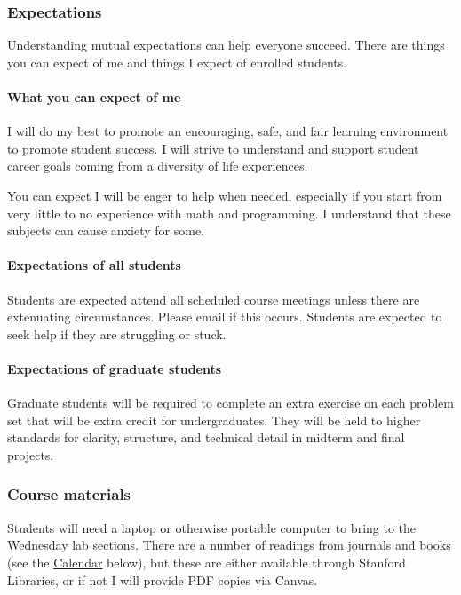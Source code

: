 \documentclass[
]{article}
\begin{document}
\subsubsection{Expectations}\label{expectations}

Understanding mutual expectations can help everyone succeed. There are
things you can expect of me and things I expect of enrolled students.

\paragraph{What you can expect of me}\label{what-you-can-expect-of-me}

I will do my best to promote an encouraging, safe, and fair learning
environment to promote student success. I will strive to understand and
support student career goals coming from a diversity of life
experiences.

You can expect I will be eager to help when needed, especially if you
start from very little to no experience with math and programming. I
understand that these subjects can cause anxiety for some.

\paragraph{Expectations of all
students}\label{expectations-of-all-students}

Students are expected attend all scheduled course meetings unless there
are extenuating circumstances. Please email if this occurs. Students are
expected to seek help if they are struggling or stuck.

\paragraph{Expectations of graduate
students}\label{expectations-of-graduate-students}

Graduate students will be required to complete an extra exercise on each
problem set that will be extra credit for undergraduates. They will be
held to higher standards for clarity, structure, and technical detail in
midterm and final projects.

\subsubsection{Course materials}\label{course-materials}

Students will need a laptop or otherwise portable computer to bring to
the Wednesday lab sections. There are a number of readings from journals
and books (see the \href{./\#Calendar}{Calendar} below), but these are
either available through Stanford Libraries, or if not I will provide
PDF copies via Canvas.
\end{document}
